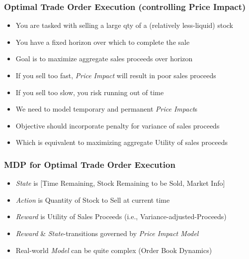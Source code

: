 \documentclass{beamer}
\begin{document}
\begin{frame}
\frametitle{Optimal Trade Order Execution (controlling Price Impact)}
\begin{itemize}
\item You are tasked with selling a large qty of a (relatively less-liquid) stock
\item You have a fixed horizon over which to complete the sale
\item Goal is to maximize aggregate sales proceeds over horizon
\item If you sell too fast, {\em Price Impact} will result in poor sales proceeds
\item If you sell too slow, you risk running out of time
\item We need to model temporary and permanent {\em Price Impact}s
\item Objective should incorporate penalty for variance of sales proceeds
\item Which is equivalent to maximizing aggregate Utility of sales proceeds 
\end{itemize}
\end{frame}

\begin{frame}
\frametitle{MDP for Optimal Trade Order Execution}
\begin{itemize}
\item {\em State} is [Time Remaining, Stock Remaining to be Sold, Market Info]
\item {\em Action} is Quantity of Stock to Sell at current time
\item {\em Reward} is Utility of Sales Proceeds (i.e., Variance-adjusted-Proceeds)
\item {\em Reward} \& {\em State}-transitions governed by {\em Price Impact Model}
\item Real-world {\em Model} can be quite complex (Order Book Dynamics)
\end{itemize}
\end{frame}
\end{document}
